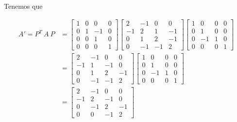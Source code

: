 \begin{example}
Tenemos que 

\begin{equation*}
\begin{split}
A' = P^{T}~A~P & = \begin{bmatrix}
                1 &  0  &  0 & 0\\
                0 &  1  & -1 & 0\\
                0 &  0  &  1 & 0 \\
                0 &  0  &  0 & 1
             \end{bmatrix}
             \begin{bmatrix}
                2 & -1  &  0 &  0\\
               -1 &  2  &  1 & -1\\
                0 &  1  &  2 & -1 \\
                0 & -1  & -1 &  2
           \end{bmatrix}
           \begin{bmatrix}
                1 &  0  & 0 & 0\\
                0 &  1  & 0 & 0\\
                0 & -1  & 1 & 0 \\
                0 &  0  & 0 & 1
            \end{bmatrix}\\
 & = \begin{bmatrix}
                2 & -1  &  0 &   0\\
               -1 &  1  & -1 &   0\\
                0 &  1  &  2 &  -1 \\
                0 & -1  & -1 &   2
           \end{bmatrix}
           \begin{bmatrix}
                1 &  0  & 0 & 0\\
                0 &  1  & 0 & 0\\
                0 & -1  & 1 & 0 \\
                0 &  0  & 0 & 1
            \end{bmatrix}\\
 & = \begin{bmatrix}
                2 & -1  &   0   &   0\\
               -1 &  2  &  -1  &   0\\
                0 & -1  &   2  &  -1 \\
                0 &  0  &  -1  &   2
           \end{bmatrix}
\end{split}
\end{equation*}


\end{example}
